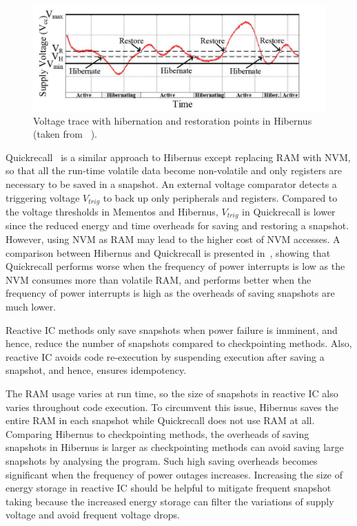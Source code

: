 \begin{figure}
    \centering
    \includegraphics[width=\columnwidth]{ch2_review/figures/hibernus}
    \caption{Voltage trace with hibernation and restoration points in Hibernus (taken from \cite{balsamo2015hibernus}~).}
    \label{Figure:hibernus}
\end{figure}

Quickrecall~\cite{jayakumar2014quickrecall} is a similar approach to Hibernus except replacing RAM with NVM, so that all the run-time volatile data become non-volatile and only registers are necessary to be saved in a snapshot. An external voltage comparator detects a triggering voltage $V_{trig}$ to back up only peripherals and registers. Compared to the voltage thresholds in Mementos and Hibernus, $V_{trig}$ in Quickrecall is lower since the reduced energy and time overheads for saving and restoring a snapshot. However, using NVM as RAM may lead to the higher cost of NVM accesses. A comparison between Hibernus and Quickrecall is presented in~\cite{rodriguez2015approaches}, showing that Quickrecall performs worse when the frequency of power interrupts is low as the NVM consumes more than volatile RAM, and performs better when the frequency of power interrupts is high as the overheads of saving snapshots are much lower.

Reactive IC methods only save snapshots when power failure is imminent, and hence, reduce the number of snapshots compared to checkpointing methods. Also, reactive IC avoids code re-execution by suspending execution after saving a snapshot, and hence, ensures idempotency. 

The RAM usage varies at run time, so the size of snapshots in reactive IC also varies throughout code execution. To circumvent this issue, Hibernus saves the entire RAM in each snapshot while Quickrecall does not use RAM at all. Comparing Hibernus to checkpointing methods, the overheads of saving snapshots in Hibernus is larger as checkpointing methods can avoid saving large snapshots by analysing the program. Such high saving overheads becomes significant when the frequency of power outages increases. Increasing the size of energy storage in reactive IC should be helpful to mitigate frequent snapshot taking because the increased energy storage can filter the variations of supply voltage and avoid frequent voltage drops. 

